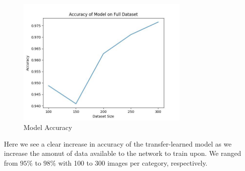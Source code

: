 \documentclass{article}
\begin{document}
\begin{figure}[H]
    \centering
    \includegraphics[width = 0.75\textwidth]{imgs/model_accuracy.jpg}
    \caption{Model Accuracy}
\end{figure}

Here we see a clear increase in accuracy of the transfer-learned model as we increase the amonut of data available to the network to train upon. We ranged from $95\%$ to $98\%$ with 100 to 300 images per category, respectively.
\end{document}
